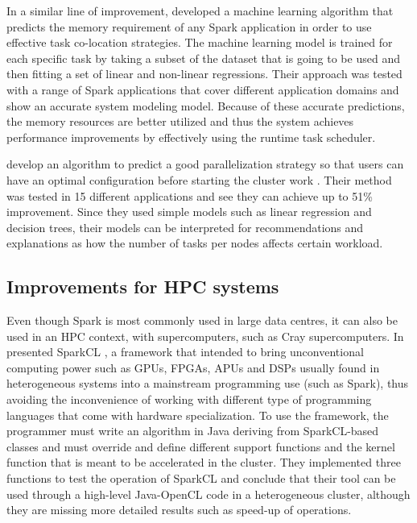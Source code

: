 \documentclass{article}
\begin{document}
In a similar line of improvement, \citeauthor{Marco2017} \cite{Marco2017} developed a machine learning algorithm that predicts the memory requirement of any Spark application in order to use effective task co-location strategies. The machine learning model is trained for each specific task by taking a subset of the dataset that is going to be used and then fitting a set of linear and non-linear regressions. Their approach was tested with a range of Spark applications that cover different application domains and show an accurate system modeling model. Because of these accurate predictions, the memory resources are better utilized and thus the system achieves performance improvements by effectively using the runtime task scheduler.

\citeauthor{BrandonHernandez2017} develop an algorithm to predict a good parallelization strategy so that users can have an optimal configuration before starting the cluster work \cite{BrandonHernandez2017}. Their method was tested in 15 different applications and see they can achieve up to 51\% improvement. Since they used simple models such as linear regression and decision trees, their models can be interpreted for recommendations and explanations as how the number of tasks per nodes affects certain workload.

\subsection{Improvements for HPC systems}

Even though Spark is most commonly used in large data centres, it can also be used in an HPC context, with supercomputers, such as Cray supercomputers. In \citeyear{Segal2015} \citeauthor{Segal2015} presented SparkCL \cite{Segal2015}, a framework that intended to bring unconventional computing power such as GPUs, FPGAs, APUs and DSPs usually found in heterogeneous systems into a mainstream programming use (such as Spark), thus avoiding the inconvenience of working with different type of programming languages that come with hardware specialization. To use the framework, the programmer must write an algorithm in Java deriving from SparkCL-based classes and must override and define different support functions and the kernel function that is meant to be accelerated in the cluster. They implemented three functions to test the operation of SparkCL and conclude that their tool can be used through a high-level Java-OpenCL code in a heterogeneous cluster, although they are missing more detailed results such as speed-up of operations.
\end{document}
